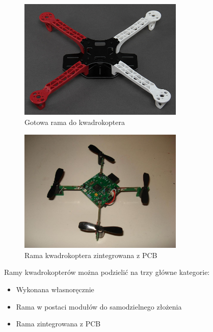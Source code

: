 \begin{figure}[H]
	\centering
		\includegraphics[width=0.7\textwidth]{Pictures/quadrotor_frame.jpg}
	\caption[Gotowa rama do kwadrokoptera]{Gotowa rama do kwadrokoptera~\cite{quadro21}}
	\label{fig:quadrotor_frame.jpg}
\end{figure}

\begin{figure}[H]
	\centering
		\includegraphics[width=0.7\textwidth]{Pictures/picocopter.jpg}
	\caption[Rama kwadrokoptera zintegrowana z PCB]{Rama kwadrokoptera zintegrowana z PCB~\cite{quadro22}}
	\label{fig:picocopter.jpg}
\end{figure}


Ramy kwadrokopterów można podzielić na trzy główne kategorie:

\begin{itemize}
	\item Wykonana własnoręcznie
	\item Rama w postaci modułów do samodzielnego złożenia
	\item Rama zintegrowana z PCB
\end{itemize}

